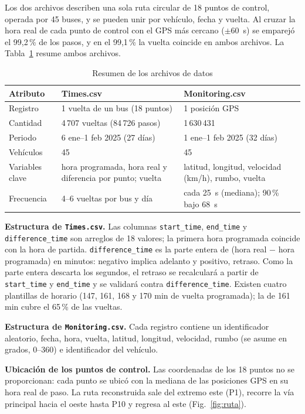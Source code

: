 \documentclass[conference,spanish]{IEEEtran}
\begin{document}
Los dos archivos describen una sola ruta circular de 18 puntos de control, operada por 45 buses, y se pueden unir por vehículo, fecha y vuelta. Al cruzar la hora real de cada punto de control con el GPS más cercano ($\pm$60~s) se emparejó el 99,2\,\% de los pasos, y en el 99,1\,\% la vuelta coincide en ambos archivos. La Tabla~\ref{tab:datasets} resume ambos archivos.

\begin{table}[h]
\centering
\caption{Resumen de los archivos de datos}
\label{tab:datasets}
\footnotesize
\begin{tabular}{@{}p{1.6cm}p{3.1cm}p{3.1cm}@{}}
\toprule
\textbf{Atributo} & \textbf{Times.csv} & \textbf{Monitoring.csv}\\
\midrule
Registro & 1 vuelta de un bus (18 puntos) & 1 posición GPS\\
Cantidad & 4\,707 vueltas (84\,726 pasos) & 1\,630\,431\\
Periodo & 6 ene--1 feb 2025 (27 días) & 1 ene--1 feb 2025 (32 días)\\
Vehículos & 45 & 45\\
Variables clave & hora programada, hora real y diferencia por punto; vuelta & latitud, longitud, velocidad (km/h), rumbo, vuelta\\
Frecuencia & 4--6 vueltas por bus y día & cada 25~s (mediana); 90\,\% bajo 68~s\\
\bottomrule
\end{tabular}
\end{table}

\textbf{Estructura de \texttt{Times.csv}.} Las columnas \texttt{start\_time}, \texttt{end\_time} y \texttt{difference\_time} son arreglos de 18 valores; la primera hora programada coincide con la hora de partida. \texttt{difference\_time} es la parte entera de (hora real $-$ hora programada) en minutos: negativo implica adelanto y positivo, retraso. Como la parte entera descarta los segundos, el retraso se recalculará a partir de \texttt{start\_time} y \texttt{end\_time} y se validará contra \texttt{difference\_time}. Existen cuatro plantillas de horario (147, 161, 168 y 170 min de vuelta programada); la de 161 min cubre el 65\,\% de las vueltas.

\textbf{Estructura de \texttt{Monitoring.csv}.} Cada registro contiene un identificador aleatorio, fecha, hora, vuelta, latitud, longitud, velocidad, rumbo (se asume en grados, 0--360) e identificador del vehículo.

\textbf{Ubicación de los puntos de control.} Las coordenadas de los 18 puntos no se proporcionan: cada punto se ubicó con la mediana de las posiciones GPS en su hora real de paso. La ruta reconstruida sale del extremo este (P1), recorre la vía principal hacia el oeste hasta P10 y regresa al este (Fig.~\ref{fig:ruta}).
\end{document}
